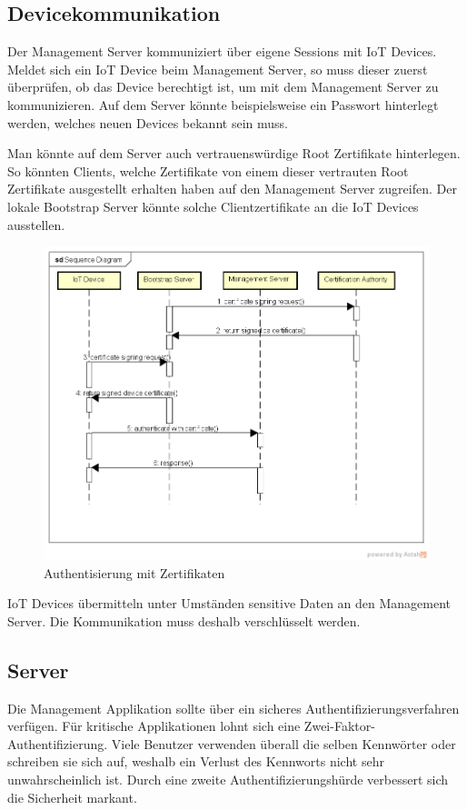 \subsection{Devicekommunikation}
Der Management Server kommuniziert über eigene Sessions mit IoT Devices. Meldet sich ein IoT Device beim Management Server, so muss dieser zuerst überprüfen, ob das Device berechtigt ist, um mit dem Management Server zu kommunizieren. Auf dem Server könnte beispielsweise ein Passwort hinterlegt werden, welches neuen Devices bekannt sein muss. 

Man könnte auf dem Server auch vertrauenswürdige Root Zertifikate hinterlegen. So könnten Clients, welche Zertifikate von einem dieser vertrauten Root Zertifikate ausgestellt erhalten haben auf den Management Server zugreifen. Der lokale Bootstrap Server könnte solche Clientzertifikate an die IoT Devices ausstellen.

\begin{figure}[H]
\centering
\includegraphics[scale=0.7]{../02_Analyse/images/certificateauthentication.png}
\caption{Authentisierung mit Zertifikaten}
\end{figure}

IoT Devices übermitteln unter Umständen sensitive Daten an den Management Server. Die Kommunikation muss deshalb verschlüsselt werden.

\subsection{Server}
Die Management Applikation sollte über ein sicheres Authentifizierungsverfahren verfügen. Für kritische Applikationen lohnt sich eine Zwei-Faktor-Authentifizierung. Viele Benutzer verwenden überall die selben Kennwörter oder schreiben sie sich auf, weshalb ein Verlust des Kennworts nicht sehr unwahrscheinlich ist. Durch eine zweite Authentifizierungshürde verbessert sich die Sicherheit markant.

